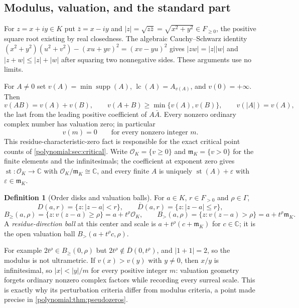 \documentclass[11pt,letterpaper]{article}
\numberwithin{equation}{section}
\theoremstyle{definition}
\newtheorem{definition}[theorem]{Definition}
\theoremstyle{remark}\newtheorem{remark}[theorem]{Remark}
\newcommand{\C}{\mathbb C}
\newcommand{\OO}{\mathcal O}
\newcommand{\mm}{\mathfrak m}
\newcommand{\st}{\operatorname{st}}
\newcommand{\supp}{\operatorname{supp}}
\newcommand{\lc}{\operatorname{lc}}
\newcommand{\Bge}[2]{B_{\ge}(#1,#2)}
\newcommand{\Bgt}[2]{B_{>}(#1,#2)}
\begin{document}
\subsection{Modulus, valuation, and the standard part}
For $z=x+iy\in K$ put $\bar z=x-iy$ and $|z|=\sqrt{z\bar z}=\sqrt{x^2+y^2}\in
F_{\ge0}$, the positive square root existing by real closedness. The
algebraic Cauchy--Schwarz identity
$(x^2+y^2)(u^2+v^2)-(xu+yv)^2=(xv-yu)^2$ gives $|zw|=|z||w|$ and
$|z+w|\le|z|+|w|$ after squaring two nonnegative sides. These arguments use
no limits.

For $A\ne0$ set $v(A)=\min\supp(A)$, $\lc(A)=A_{v(A)}$, and $v(0)=+\infty$.
Then
\begin{equation}\label{polynomial:eq:valuation}
 v(AB)=v(A)+v(B),\qquad v(A+B)\ge\min\{v(A),v(B)\},\qquad v(|A|)=v(A),
\end{equation}
the last from the leading positive coefficient of $A\bar A$. Every nonzero
ordinary complex number has valuation zero; in particular
\begin{equation}\label{polynomial:eq:integersunit}
 v(m)=0\qquad\text{for every nonzero integer }m .
\end{equation}
This residue-characteristic-zero fact is responsible for the exact critical
point counts of \cref{polynomial:sec:critical}. Write
$\OO_K=\{v\ge0\}$ and $\mm_K=\{v>0\}$ for the finite elements and the
infinitesimals; the coefficient at exponent zero gives
$\st:\OO_K\to\C$ with $\OO_K/\mm_K\cong\C$, and every finite $A$ is uniquely
$\st(A)+\varepsilon$ with $\varepsilon\in\mm_K$.

\begin{definition}[Order disks and valuation balls]\label{polynomial:def:balls}
For $a\in K$, $r\in F_{>0}$ and $\rho\in\Gamma$,
\[
 D(a,r)=\{z:|z-a|<r\},\qquad \overline D(a,r)=\{z:|z-a|\le r\},
\]
\[
 \Bge a\rho=\{z:v(z-a)\ge\rho\}=a+t^\rho\OO_K,
 \qquad
 \Bgt a\rho=\{z:v(z-a)>\rho\}=a+t^\rho\mm_K.
\]
A \emph{residue-direction ball} at this center and scale is
$a+t^\rho(c+\mm_K)$ for $c\in\C$; it is the open valuation ball
$\Bgt{a+t^\rho c}{\rho}$.
\end{definition}

For example $2t^\rho\in\Bge0\rho$ but $2t^\rho\notin\overline D(0,t^\rho)$, and
$|1+1|=2$, so the modulus is not ultrametric. If $v(x)>v(y)$ with $y\ne0$,
then $x/y$ is infinitesimal, so $|x|<|y|/m$ for every positive integer $m$:
valuation geometry forgets ordinary nonzero complex factors while recording
every surreal scale. This is exactly why its perturbation criteria differ from
modulus criteria, a point made precise in \cref{polynomial:thm:pseudozeros}.
\end{document}
